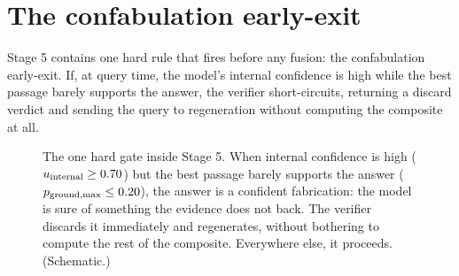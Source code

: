 \section{The confabulation early-exit}
\label{sec:verifier-earlyexit}

Stage 5 contains one hard rule that fires before any fusion: the confabulation
early-exit. If, at query time, the model's internal confidence is high while the
best passage barely supports the answer, the verifier short-circuits, returning a
discard verdict and sending the query to regeneration without computing the
composite at all.

\begin{figure}[htbp]
\centering
{}
\caption[The confabulation early-exit]{The one hard gate inside Stage 5. When
internal confidence is high ($u_{\text{internal}} \ge 0.70$) but the best passage barely supports
the answer ($p_{\text{ground,max}} \le 0.20$), the answer is a confident fabrication: the model is
sure of something the evidence does not back. The verifier discards it immediately
and regenerates, without bothering to compute the rest of the composite. Everywhere
else, it proceeds. (Schematic.)}
\label{fig:early-exit}
\end{figure}

